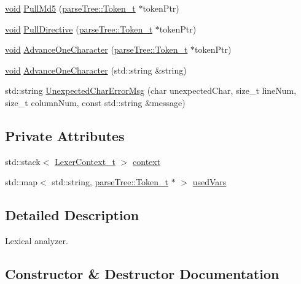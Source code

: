 \begin{DoxyCompactItemize}
\item 
\hyperlink{_t_e_m_p_l_a_t_e__cdef_8h_ac9c84fa68bbad002983e35ce3663c686}{void} \hyperlink{classparser_1_1_lexer__t_a7cf14c3c28b8e4a7800a353b0e2baa2b}{Pull\+Md5} (\hyperlink{structparse_tree_1_1_token__t}{parse\+Tree\+::\+Token\+\_\+t} $\ast$token\+Ptr)
\item 
\hyperlink{_t_e_m_p_l_a_t_e__cdef_8h_ac9c84fa68bbad002983e35ce3663c686}{void} \hyperlink{classparser_1_1_lexer__t_a531bca3310981b9e15e75c5d0aa3ce15}{Pull\+Directive} (\hyperlink{structparse_tree_1_1_token__t}{parse\+Tree\+::\+Token\+\_\+t} $\ast$token\+Ptr)
\item 
\hyperlink{_t_e_m_p_l_a_t_e__cdef_8h_ac9c84fa68bbad002983e35ce3663c686}{void} \hyperlink{classparser_1_1_lexer__t_a6b2e41e534543875f3527ed90246400a}{Advance\+One\+Character} (\hyperlink{structparse_tree_1_1_token__t}{parse\+Tree\+::\+Token\+\_\+t} $\ast$token\+Ptr)
\item 
\hyperlink{_t_e_m_p_l_a_t_e__cdef_8h_ac9c84fa68bbad002983e35ce3663c686}{void} \hyperlink{classparser_1_1_lexer__t_a8256bb13aac4125dd4e7c8cf9c62717e}{Advance\+One\+Character} (std\+::string \&string)
\item 
std\+::string \hyperlink{classparser_1_1_lexer__t_a251ce44c29ccc943402c9d8364cc366c}{Unexpected\+Char\+Error\+Msg} (char unexpected\+Char, size\+\_\+t line\+Num, size\+\_\+t column\+Num, const std\+::string \&message)
\end{DoxyCompactItemize}
\subsection*{Private Attributes}
\begin{DoxyCompactItemize}
\item 
std\+::stack$<$ \hyperlink{structparser_1_1_lexer__t_1_1_lexer_context__t}{Lexer\+Context\+\_\+t} $>$ \hyperlink{classparser_1_1_lexer__t_afae84cc96dffa6d100481e254e92fdfb}{context}
\item 
std\+::map$<$ std\+::string, \hyperlink{structparse_tree_1_1_token__t}{parse\+Tree\+::\+Token\+\_\+t} $\ast$ $>$ \hyperlink{classparser_1_1_lexer__t_a1bc0d9834fc7e2824dc22957ab9c3ad6}{used\+Vars}
\end{DoxyCompactItemize}


\subsection{Detailed Description}
Lexical analyzer. 

\subsection{Constructor \& Destructor Documentation}
